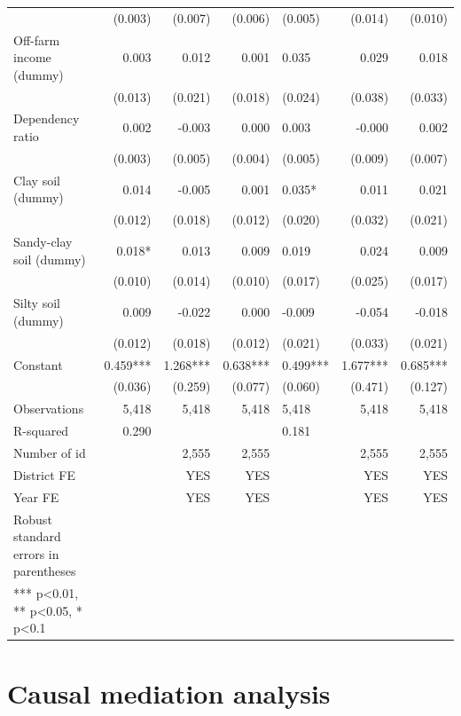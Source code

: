 \documentclass[
]{article}
\begin{document}
\begin{landscape}
\begin{longtable}[t]{lrrrlrr}
 & (0.003) & (0.007) & (0.006) & (0.005) & (0.014) & (0.010)\\
Off-farm income (dummy) & 0.003 & 0.012 & 0.001 & 0.035 & 0.029 & 0.018\\
 & (0.013) & (0.021) & (0.018) & (0.024) & (0.038) & (0.033)\\
Dependency ratio & 0.002 & -0.003 & 0.000 & 0.003 & -0.000 & 0.002\\
 & (0.003) & (0.005) & (0.004) & (0.005) & (0.009) & (0.007)\\
Clay soil (dummy) & 0.014 & -0.005 & 0.001 & 0.035* & 0.011 & 0.021\\
 & (0.012) & (0.018) & (0.012) & (0.020) & (0.032) & (0.021)\\
Sandy-clay soil (dummy) & 0.018* & 0.013 & 0.009 & 0.019 & 0.024 & 0.009\\
 & (0.010) & (0.014) & (0.010) & (0.017) & (0.025) & (0.017)\\
Silty soil (dummy) & 0.009 & -0.022 & 0.000 & -0.009 & -0.054 & -0.018\\
 & (0.012) & (0.018) & (0.012) & (0.021) & (0.033) & (0.021)\\
Constant & 0.459*** & 1.268*** & 0.638*** & 0.499*** & 1.677*** & 0.685***\\
 & (0.036) & (0.259) & (0.077) & (0.060) & (0.471) & (0.127)\\
Observations & 5,418 & 5,418 & 5,418 & 5,418 & 5,418 & 5,418\\
R-squared & 0.290 &  &  & 0.181 &  & \\
Number of id &  & 2,555 & 2,555 &  & 2,555 & 2,555\\
District FE &  & YES & YES &  & YES & YES\\
Year FE &  & YES & YES &  & YES & YES\\
Robust standard errors in parentheses &  &  &  &  &  & \\
*** p<0.01, ** p<0.05, * p<0.1 &  &  &  &  &  & \\*
\end{longtable}
\endgroup{}
\end{landscape}
\newpage

\hypertarget{causal-mediation-analysis}{%
\section{Causal mediation analysis}\label{causal-mediation-analysis}}

\begingroup\fontsize{7}{9}\selectfont
\end{document}
